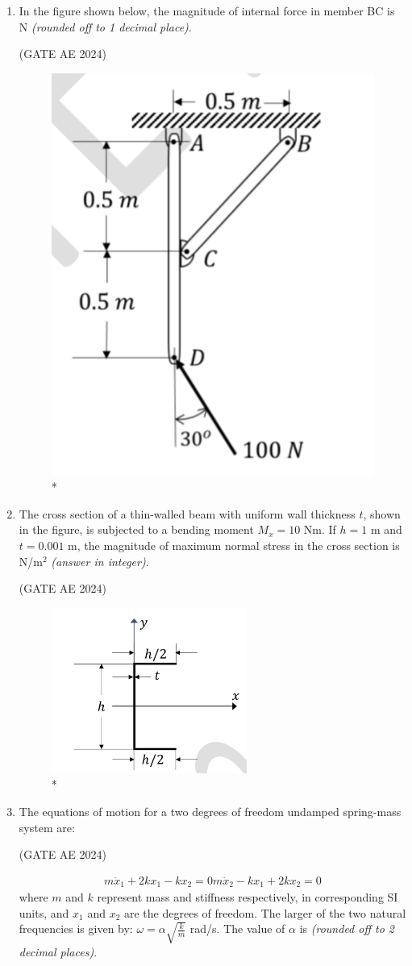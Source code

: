 \documentclass[journal,12pt,onecolumn]{IEEEtran}
\theoremstyle{remark}
\begin{document}
\begin{flushleft}
\begin{enumerate}
\item In the figure shown below, the magnitude of internal force in member BC is \underline{\hspace{3cm}} N \textit{(rounded off to 1 decimal place)}. 

\hfill (GATE AE 2024)

\begin{figure}
\includegraphics[width=0.3\columnwidth]{figs/53.png}
\caption{*}
    \label{fig:placeholder}
\end{figure}


\item The cross section of a thin-walled beam with uniform wall thickness $t$, shown in the figure, is subjected to a bending moment $M_x = 10$ Nm. If $h = 1$ m and $t = 0.001$ m, the magnitude of maximum normal stress in the cross section is \underline{\hspace{3cm}} N/m$^2$ \textit{(answer in integer)}.

\hfill (GATE AE 2024)

\begin{figure}
\includegraphics[width=0.4\columnwidth]{figs/54.png}
\caption{*}
    \label{fig:placeholder}
\end{figure}

\item The equations of motion for a two degrees of freedom undamped spring-mass system are:

\hfill (GATE AE 2024)

\begin{align*}
m\ddot{x}_1 + 2kx_1 - kx_2 = 0
m\ddot{x}_2 - kx_1 + 2kx_2 = 0
\end{align*}
where $m$ and $k$ represent mass and stiffness respectively, in corresponding SI units, and $x_1$ and $x_2$ are the degrees of freedom. The larger of the two natural frequencies is given by: $\omega = \alpha \sqrt{\frac{k}{m}}$ rad/s. The value of $\alpha$ is \underline{\hspace{3cm}} \textit{(rounded off to 2 decimal places)}.


\end{enumerate}
\end{flushleft}
\end{document}
